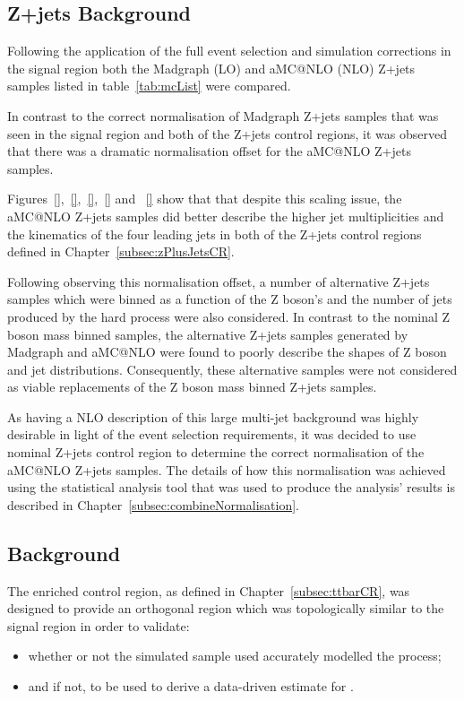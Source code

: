 \subsection{Z+jets Background}\label{subsec:zPlusJetsEstimation}
Following the application of the full event selection and simulation corrections in the signal region both the Madgraph (LO) and aMC@NLO (NLO) Z+jets samples listed in table~\ref{tab:mcList} were compared.

In contrast to the correct normalisation of Madgraph Z+jets samples that was seen in the signal region and both of the Z+jets control regions, it was observed that there was a dramatic normalisation offset for the aMC@NLO Z+jets samples.

Figures~\ref{},~\ref{},~\ref{},~\ref{} and ~\ref{} show that that despite this scaling issue, the aMC@NLO Z+jets samples did better describe the higher jet multiplicities and the kinematics of the four leading jets in both of the Z+jets control regions defined in Chapter~\ref{subsec:zPlusJetsCR}.

Following observing this normalisation offset, a number of alternative Z+jets samples which were binned as a function of the Z boson's \pT and the number of jets produced by the hard process were also considered.
In contrast to the nominal Z boson mass binned samples, the alternative Z+jets samples generated by Madgraph and aMC@NLO were found to poorly describe the shapes of Z boson and jet distributions.
Consequently, these alternative samples were not considered as viable replacements of the Z boson mass binned Z+jets samples.

As having a NLO description of this large multi-jet background was highly desirable in light of the event selection requirements, it was decided to use nominal Z+jets control region to determine the correct normalisation of the aMC@NLO Z+jets samples.
The details of how this normalisation was achieved using the statistical analysis tool that was used to produce the analysis' results is described in Chapter~\ref{subsec:combineNormalisation}.

\subsection{\ttbar Background}\label{subsec:ttbarEstimation}
The \ttbar enriched control region, as defined in Chapter~\ref{subsec:ttbarCR}, was designed to provide an orthogonal region which was topologically similar to the signal region in order to validate:
\begin{itemize}
\item whether or not the simulated \ttbar sample used accurately modelled the \ttbar process;
\item and if not, to be used to derive a data-driven estimate for \ttbar.
\end{itemize}


